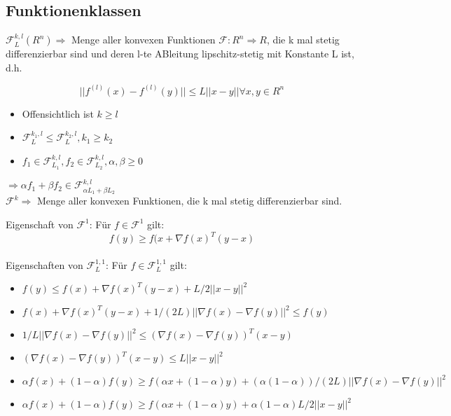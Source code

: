 \subsection{Funktionenklassen}	

$\mathcal{F}_L^{k,l} (R^n) \Rightarrow$
Menge aller konvexen Funktionen	$\mathcal{F}:R^n \Rightarrow R$, die k mal stetig differenzierbar sind und deren l-te ABleitung lipschitz-stetig mit Konstante L ist, d.h.

\begin{equation}
||f^{(l)} (x) - f^{(l)} (y)|| \leq L ||x-y|| \forall x,y \in R^n
\end{equation}

\begin{itemize}
	\item Offensichtlich ist $k \geq l$
	\item $\mathcal{F}_L^{k_1,l} \leq \mathcal{F}_L^{k_2,l}, k_1 \geq k_2$
	\item $f_1 \in \mathcal{F}_{L_1}^{k,l}, f_2 \in \mathcal{F}_{L_2}^{k,l}, \alpha, \beta \geq 0$
\end{itemize}

$\Rightarrow \alpha f_1 + \beta f_2 \in \mathcal{F}_{\alpha L_1 + \beta L_2}^{k,l}$\\


$\mathcal{F}^k \Rightarrow$ Menge aller konvexen Funktionen, die k mal stetig differenzierbar sind.

Eigenschaft von $\mathcal{F}^1$: Für $f \in \mathcal{F}^1$ gilt:\\
\begin{equation}
	f(y) \geq f(x+ \nabla f(x)^T (y-x)
\end{equation}\\

Eigenschaften von $\mathcal{F}^{1,1}_L$: Für $f \in \mathcal{F}^{1,1}_L$ gilt:\\
\begin{itemize}
	\item $f(y) \leq f(x) + \nabla f(x)^T (y-x) + L/2 ||x-y||^2$
	\item $f(x) + \nabla f(x)^T (y-x) + 1/(2L) || \nabla f(x) - \nabla f(y)||^2 \leq f(y)$
	\item $ 1/L || \nabla f(x) - \nabla f(y)||^2 \leq (\nabla f(x) - \nabla f(y))^T (x-y)$
	\item $(\nabla f(x) - \nabla f(y))^T (x-y) \leq L ||x-y||^2$
	\item $ \alpha f(x) + (1-\alpha) f(y) \geq f(\alpha x + (1-\alpha)y) + (\alpha(1-\alpha))/(2L) || \nabla f(x) - \nabla f(y)||^2$
	\item $\alpha f(x) + (1-\alpha) f(y) \geq f(\alpha x + (1-\alpha)y) + \alpha (1-\alpha) L/2 ||x-y||^2$
\end{itemize}

